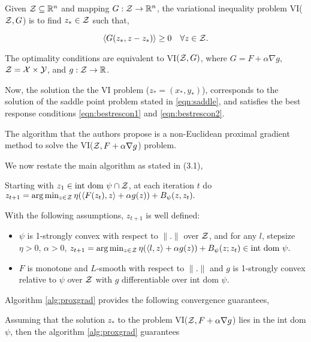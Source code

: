 \begin{definition}
    Given $\mathcal{Z} \subseteq \mathbb{R}^n$ and mapping $G: \mathcal{Z} \rightarrow \mathbb{R}^n$, the variational inequality problem
    VI($\mathcal{Z}, G$) is to find $z_{\ast} \in \mathcal{Z}$ such that,

    $$\langle G(z_{\ast}, z - z_{\ast}) \rangle \geq 0 \quad \forall z \in \mathcal{Z}. $$
\end{definition}


The optimality conditions are equivalent to VI$(\mathcal{Z}, G)$, where $G = F + \alpha \nabla g$,  $\mathcal{Z} = \mathcal{X} \times \mathcal{Y}$, and
$g: \mathcal{Z} \rightarrow \mathbb{R}$.

Now, the solution the the VI problem ($z_{\ast}= (x_{\ast}, y_{\ast})$), corresponds to the
solution of the saddle point problem stated in \ref{eqn:saddle}, and satisfies the best response conditions
\ref{eqn:bestrescon1} and \ref{eqn:bestrescon2}.

The algorithm that the authors propose is a non-Euclidean proximal gradient method to solve the VI($\mathcal{Z}, F + \alpha \nabla g$) problem.

We now restate the main algorithm as stated in \cite{sokotaUnified2023}(3.1),

\begin{alprocedure}
    \label{alg:proxgrad}
    Starting with $z_1  \in \text{int dom } \psi \cap \mathcal{Z}$, at each iteration $t$ do
    $z_{t+1} = \arg \min_{z \in \mathcal{Z}} \eta (\langle F(z_t), z\rangle + \alpha g(z)) + B_{\psi} (z, z_t).$
\end{alprocedure}

With the following assumptions, $z_{t+1}$ is well defined:

\begin{itemize}
    \item $\psi$ is 1-strongly convex with respect to $\|.\|$ over $\mathcal{Z}$, and for
          any $l$, stepsize $\eta > 0$, $\alpha > 0$,
          $z_{t+1} = \arg \min_{z \in \mathcal{Z}} \eta (\langle l, z \rangle + \alpha g(z)) + B_{\psi}(z;z_t) \in \text{int dom } \psi.$

    \item $F$ is monotone and $L$-smooth with respect to $\|.\|$ and $g$ is 1-strongly convex
          relative to $\psi$ over $\mathcal{Z}$ with $g$ differentiable over int dom $\psi$.
\end{itemize}

Algorithm \ref{alg:proxgrad} provides the following convergence guarantees,

Assuming that the solution $z_{\ast}$ to the problem VI($\mathcal{Z}, F + \alpha \nabla g$) lies in the int dom $\psi$, then
the algorithm \ref{alg:proxgrad} guarantees

